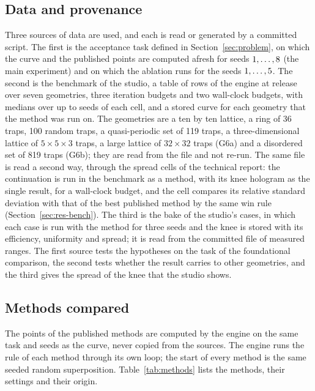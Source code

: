 \subsection{Data and provenance}\label{sec:data}

Three sources of data are used, and each is read or generated by a committed script. The first is the acceptance task defined in Section~\ref{sec:problem}, on which the curve and the published points are computed afresh for seeds $1,\dots,8$ (the main experiment) and on which the ablation runs for the seeds $1,\dots,5$. The second is the benchmark of the studio, a table of \benchRows{} rows of the engine at release \benchEngine{} over seven geometries,
three iteration budgets and two wall-clock budgets, with medians over up to \benchSeeds{} seeds of each cell, and a stored curve for each geometry that the method was run on. The geometries are a ten by ten lattice, a ring of 36 traps, 100 random traps, a quasi-periodic set of 119 traps, a three-dimensional lattice of $5\times5\times3$ traps, a large lattice of $32\times32$ traps (G6a) and a disordered set of 819 traps (G6b); they are read from the file and not re-run. The same file is read a second way, through the spread cells of the technical report: the continuation is run in the benchmark as a method, with its knee hologram as the single result, for a wall-clock budget, and the cell compares its relative standard deviation with that of the best published method by the same win rule (Section~\ref{sec:res-bench}).
The third is the bake of the studio's cases, in which each case is run with the method for three seeds and the knee is stored with its efficiency, uniformity and spread; it is read from the committed file of measured ranges. The first source tests the hypotheses on the task of the foundational comparison, the second tests whether the result carries to other geometries, and the third gives the
spread of the knee that the studio shows.

\subsection{Methods compared}\label{sec:compared}

The points of the published methods are computed by the engine on the same task and seeds as the curve, never copied from the sources. The engine runs the rule of each method through its own loop; the start of every method is the same seeded random superposition. Table~\ref{tab:methods} lists the methods, their settings and their origin.

